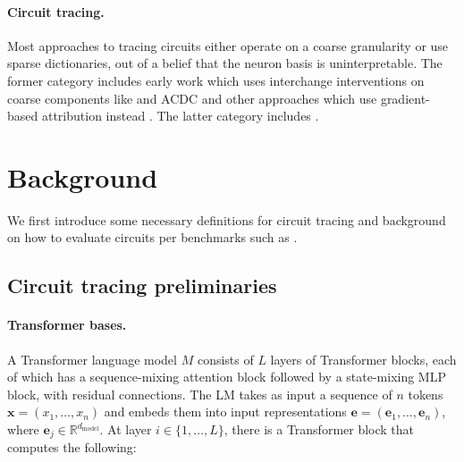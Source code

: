\documentclass{article}
\theoremstyle{plain}
\theoremstyle{definition}
\theoremstyle{remark}
\begin{document}
\paragraph{Circuit tracing.} Most approaches to tracing circuits either operate on a coarse granularity or use sparse dictionaries, out of a belief that the neuron basis is uninterpretable. The former category includes early work which uses interchange interventions on coarse components like \citet{wang2022interpretability} and ACDC \citep{conmy2023towards} and other approaches which use gradient-based attribution instead \citep{syed2024attribution,hanna2024faith,mueller2025mib}. The latter category includes \citet{marks2025sparse,ge2024automatically,dunefsky2024transcoders,ameisen2025circuit,lindsey2025biology}.

\section{Background}

We first introduce some necessary definitions for circuit tracing and background on how to evaluate circuits per benchmarks such as \citet{marks2025sparse,mueller2025mib}.


\subsection{Circuit tracing preliminaries}

\paragraph{Transformer bases.} A Transformer language model $M$ consists of $L$ layers of Transformer blocks, each of which has a sequence-mixing attention block followed by a state-mixing MLP block, with residual connections.
The LM takes as input a sequence of $n$ tokens $\mathbf{x} = (x_1, \ldots, x_n)$ and embeds them into input representations $\mathbf{e} = (\mathbf{e}_1, \ldots, \mathbf{e}_n)$, where $\mathbf{e}_j \in \mathbb{R}^{d_\text{model}}$. At layer $i \in \{1, \ldots, L\}$, there is a Transformer block that computes the following:
\end{document}
